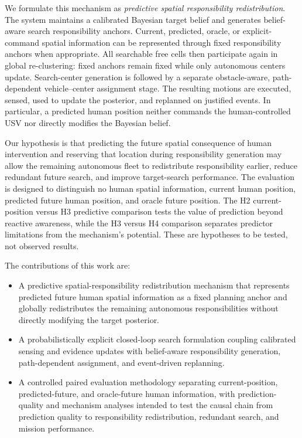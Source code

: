 \documentclass[letterpaper, 10pt, conference]{ieeeconf}
\begin{document}
We formulate this mechanism as \emph{predictive spatial responsibility redistribution}. The system maintains a calibrated Bayesian target belief and generates belief-aware search responsibility anchors. Current, predicted, oracle, or explicit-command spatial information can be represented through fixed responsibility anchors when appropriate. All searchable free cells then participate again in global re-clustering: fixed anchors remain fixed while only autonomous centers update. Search-center generation is followed by a separate obstacle-aware, path-dependent vehicle--center assignment stage. The resulting motions are executed, sensed, used to update the posterior, and replanned on justified events. In particular, a predicted human position neither commands the human-controlled USV nor directly modifies the Bayesian belief.

Our hypothesis is that predicting the future spatial consequence of human intervention and reserving that location during responsibility generation may allow the remaining autonomous fleet to redistribute responsibility earlier, reduce redundant future search, and improve target-search performance. The evaluation is designed to distinguish no human spatial information, current human position, predicted future human position, and oracle future position. The H2 current-position versus H3 predictive comparison tests the value of prediction beyond reactive awareness, while the H3 versus H4 comparison separates predictor limitations from the mechanism's potential. These are hypotheses to be tested, not observed results.

The contributions of this work are:
\begin{itemize}
  \item A predictive spatial-responsibility redistribution mechanism that represents predicted future human spatial information as a fixed planning anchor and globally redistributes the remaining autonomous responsibilities without directly modifying the target posterior.
  \item A probabilistically explicit closed-loop search formulation coupling calibrated sensing and evidence updates with belief-aware responsibility generation, path-dependent assignment, and event-driven replanning.
  \item A controlled paired evaluation methodology separating current-position, predicted-future, and oracle-future human information, with prediction-quality and mechanism analyses intended to test the causal chain from prediction quality to responsibility redistribution, redundant search, and mission performance.
\end{itemize}
\end{document}
